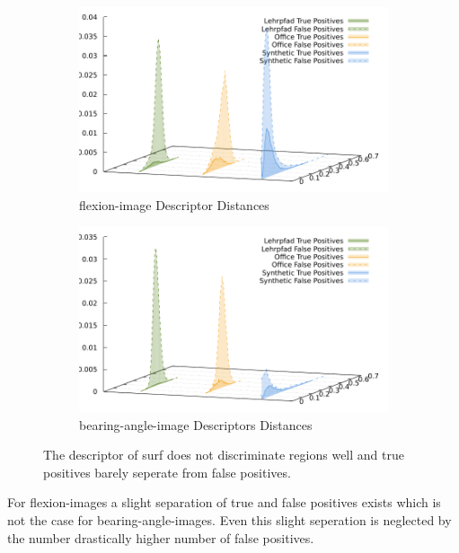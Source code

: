 \begin{figure}[htp]
\begin{subfigure}[t]{0.45\linewidth}
    \includegraphics[width=\linewidth]{chapter06/results/SURF/flexion/descriptor_distances.pdf}%
    \caption{\gls{flexion-image} Descriptor Distances}
\end{subfigure}\quad
\begin{subfigure}[t]{0.45\linewidth}
    \includegraphics[width=\linewidth]{chapter06/results/SURF/bearing/descriptor_distances.pdf}%
    \caption{\gls{bearing-angle-image} Descriptors Distances}
\end{subfigure}
    \caption{The descriptor of \acrshort{surf} does not discriminate regions well and true positives barely seperate from false positives.}\label{fig:surf_descriptor_distance}
\end{figure}
For \glspl{flexion-image} a slight separation of true and false positives exists which is not the case for \glspl{bearing-angle-image}.
Even this slight seperation is neglected by the number drastically higher number of false positives.

